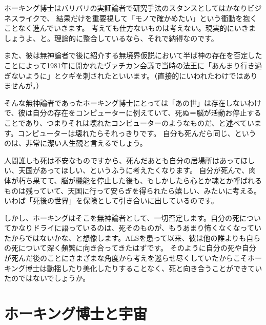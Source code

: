 \documentclass[10pt,b5paper,papersize,dvipdfmx]{jsbook}
\begin{document}
ホーキング博士はバリバリの実証論者で研究手法のスタンスとしてはかなりビジネスライクで、
結果だけを重要視して「モノで確かめたい」という衝動を抱くことなく進んでいきます。
考えても仕方ないものは考えない。現実的にいきましょうよ、と。理論的に整合しているなら、それで納得なのです。\par
また、彼は無神論者で後に紹介する無境界仮説において半ば神の存在を否定したことによって1981年に開かれたヴァチカン会議で当時の法王に「あんまり行き過ぎないように」とクギを刺されたといいます。（直接的にいわれたわけではありませんが。）\par
そんな無神論者であったホーキング博士にとっては「あの世」は存在しないわけで、彼は自分の存在をコンピューターに例えていて、死ぬ＝脳が活動お停止することであり、つまりそれは壊れたコンピューターのようなものだ、と述べています。コンピューターは壊れたらそれっきりです。
自分も死んだら同じ、というのは、非常に潔い人生観と言えるでしょう。\par
人間誰しも死は不安なものですから、死んだあとも自分の居場所はあってほしい、天国があってほしい、というふうに考えたくなります。
自分が死んで、肉体が朽ち果てて、脳が機能を停止した後も、もしかしたら心とか魂とか呼ばれるものは残っていて、天国に行って安らぎを得られたら嬉しい、みたいに考える。いわば「死後の世界」を保険として引き合いに出しているのです。\par
しかし、ホーキングはそこを無神論者として、一切否定します。自分の死についてかなりドライに語っているのは、死そのものが、もうあまり怖くなくなっていたからではないかな、と想像します。ALSを患って以来、彼は他の誰よりも自らの死について深く頻繁に向き合ってきたはずです。
そのように自分の死や自分が死んだ後のことにさまざまな角度から考えを巡らせ尽くしていたからこそホーキング博士は動揺したり美化したりすることなく、死と向き合うことができていたのではないでしょうか。\par


\section{ホーキング博士と宇宙}
\end{document}
